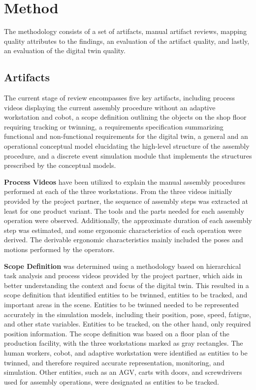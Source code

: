 \documentclass{llncs}
\begin{document}
    \section{Method}
    The methodology consists of a set of artifacts, manual artifact reviews, mapping quality attributes to the findings, an evaluation of the artifact quality, and lastly, an evaluation of the digital twin quality.   
    \subsection{Artifacts}\label{section:Artifacts}
    The current stage of review encompasses five key artifacts, including process videos displaying the current assembly procedure without an adaptive workstation and cobot, a scope definition outlining the objects on the shop floor requiring tracking or twinning, a requirements specification summarizing functional and non-functional requirements for the digital twin, a general and an operational conceptual model elucidating the high-level structure of the assembly procedure, 
    and a discrete event simulation module that implements the structures prescribed by the conceptual models.

    \textbf{Process Videos} have been utilized to explain the manual assembly procedures performed at each of the three workstations. From the three videos initially provided by the project partner,  
    the sequence of assembly steps was extracted at least for one product variant. The tools and the parts needed for each assembly operation were observed. Additionally, the approximate duration of each assembly step 
    was estimated, and some ergonomic characteristics of each operation were derived. 
    The derivable ergonomic characteristics mainly included the poses and motions performed by the operators.

    \textbf{Scope Definition} was determined using a methodology based on hierarchical task analysis and process videos provided by the project partner, which aids in better understanding the context and focus of the digital twin.
    This resulted in a scope definition that identified entities to be twinned, entities to be tracked, and important areas in the scene. 
    Entities to be twinned needed to be represented accurately in the simulation models, including their position, pose, speed, fatigue, and other state variables. 
    Entities to be tracked, on the other hand, only required position information. The scope definition was based on a floor plan of the production facility, with the three workstations marked as gray rectangles. 
    The human workers, cobot, and adaptive workstation were identified as entities to be twinned, and therefore required accurate representation, 
    monitoring, and simulation. Other entities, such as an AGV, carts with doors, and screwdrivers used for assembly operations, were designated as entities to be tracked.
\end{document}

